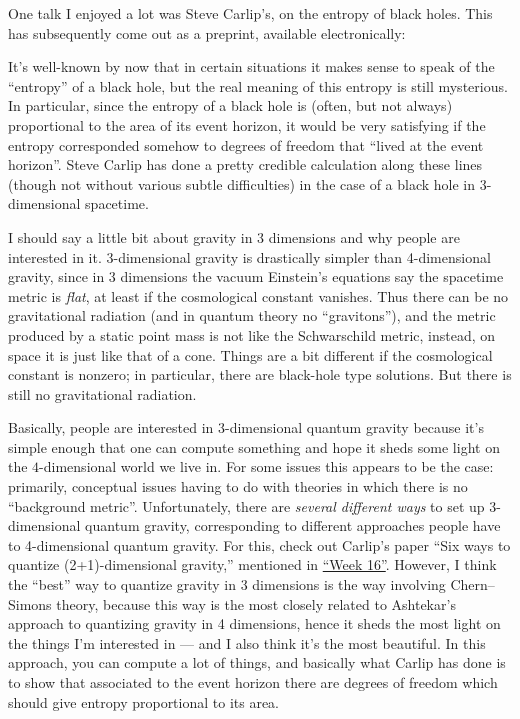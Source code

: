 \documentclass[12pt]{article}
\def\tightlist{}
\renewcommand{\texttt}[1]{%
  \begingroup
  \ttfamily
  \begingroup\lccode`~=`/\lowercase{\endgroup\def~}{/\discretionary{}{}{}}%
  \begingroup\lccode`~=`[\lowercase{\endgroup\def~}{[\discretionary{}{}{}}%
  \begingroup\lccode`~=`.\lowercase{\endgroup\def~}{.\discretionary{}{}{}}%
  \catcode`/=\active\catcode`[=\active\catcode`.=\active
  \scantokens{#1\noexpand}%
  \endgroup
}
\begin{document}
One talk I enjoyed a lot was Steve Carlip's, on the entropy of black
holes. This has subsequently come out as a preprint, available
electronically:


It's well-known by now that in certain situations it makes sense to
speak of the ``entropy'' of a black hole, but the real meaning of this
entropy is still mysterious. In particular, since the entropy of a black
hole is (often, but not always) proportional to the area of its event
horizon, it would be very satisfying if the entropy corresponded somehow
to degrees of freedom that ``lived at the event horizon''. Steve Carlip
has done a pretty credible calculation along these lines (though not
without various subtle difficulties) in the case of a black hole in
3-dimensional spacetime.

I should say a little bit about gravity in 3 dimensions and why people
are interested in it. \(3\)-dimensional gravity is drastically simpler
than 4-dimensional gravity, since in 3 dimensions the vacuum Einstein's
equations say the spacetime metric is \emph{flat}, at least if the
cosmological constant vanishes. Thus there can be no gravitational
radiation (and in quantum theory no ``gravitons''), and the metric
produced by a static point mass is not like the Schwarschild metric,
instead, on space it is just like that of a cone. Things are a bit
different if the cosmological constant is nonzero; in particular, there
are black-hole type solutions. But there is still no gravitational
radiation.

Basically, people are interested in \(3\)-dimensional quantum gravity
because it's simple enough that one can compute something and hope it
sheds some light on the \(4\)-dimensional world we live in. For some
issues this appears to be the case: primarily, conceptual issues having
to do with theories in which there is no ``background metric''.
Unfortunately, there are \emph{several different ways} to set up
\(3\)-dimensional quantum gravity, corresponding to different approaches
people have to 4-dimensional quantum gravity. For this, check out
Carlip's paper ``Six ways to quantize (2+1)-dimensional gravity,''
mentioned in \protect\hyperlink{week16}{``Week 16''}. However, I think
the ``best'' way to quantize gravity in 3 dimensions is the way
involving Chern--Simons theory, because this way is the most closely
related to Ashtekar's approach to quantizing gravity in 4 dimensions,
hence it sheds the most light on the things I'm interested in --- and I
also think it's the most beautiful. In this approach, you can compute a
lot of things, and basically what Carlip has done is to show that
associated to the event horizon there are degrees of freedom which
should give entropy proportional to its area.
\end{document}
